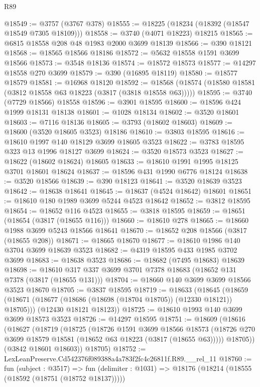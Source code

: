 \begin{lexlean}{R89}
\begin{coremodule}
@18549 := @3757 (@3767 @378)
@18555 := @18225 (@18234 (@18392 (@18547 @18549 @7305 @18109)))
@18558 := @3740 (@4071 @18223) @18215
@18565 := @6815 @18558 @208 @48 @1983 @2000 @3699 @18139
@18566 := @390 @18121
@18568 := @18565 @18566 @18186
@18572 := @5632 @18558 @1591 @3699 @18566
@18573 := @3548 @18136
@18574 := @18572 @18573
@18577 := @14297 @18558 @270 @3699
@18579 := @390 (@16895 @18119)
@18580 := @18577 @18579
@18581 := @16968 @18120
@18592 := @18568 (@18574 (@18580 @18581 (@3812 @18558 @63 @18223 (@3817 (@3818 @18558 @63)))))
@18595 := @3740 (@7729 @18566) @18558
@18596 := @3901 @18595
@18600 := @18596 @424 @1999 @18131 @18138
@18601 := @1028 @18134
@18602 := @3520 @18601
@18603 := @7116 @18136
@18605 := @3793 (@18602 @18603)
@18609 := @18600 (@3520 @18605 @3523) @18186
@18610 := @3803 @18595
@18616 := @18610 @1997 @140 @18129 @3699 @18605 @3523
@18622 := @3783 @18595 @323 @13 @1996 @18127 @3699
@18624 := @3520 @18573 @3523
@18627 := @18622 (@18602 @18624) @18605
@18633 := @18610 @1991 @1995 @18125 @3701 @18601 @18624
@18637 := @18596 @431 @1990 @6776 @18124
@18638 := @3520 @18566
@18639 := @390 @18123
@18641 := @3520 @18639 @3523
@18642 := @18638 @18641
@18645 := @18637 (@4524 @18642) @18601
@18651 := @18610 @180 @1989 @3699 @5244 @4523 @18642
@18652 := @3812 @18595
@18654 := @18652 @116 @4523
@18655 := @3818 @18595
@18659 := @18651 (@18654 (@3817 (@18655 @116)))
@18660 := @18610 @278
@18665 := @18660 @1988 @3699 @5243 @18566 @18641
@18670 := @18652 @208 @18566 (@3817 (@18655 @208))
@18671 := @18665 @18670
@18677 := @18610 @1986 @140 @3704 @3699 @18639 @3523
@18682 := @4319 @18595 @433 @1985 @3702 @3699
@18683 := @18638 @3523
@18686 := @18682 (@7495 @18683) @18639
@18698 := @18610 @317 @337 @3699 @3701 @7378 @18683 (@18652 @131 @7378 (@3817 (@18655 @131)))
@18704 := @18660 @140 @3699 @3699 @18566 @3523 @18670
@18705 := @3837 @18595
@18719 := @18633
    (@18645
      (@18659 (@18671 (@18677 (@18686 (@18698 (@18704 @18705)) (@12330 @18121)) @18705)))
      (@12430 @18121 @18123))
@18725 := @18610 @1993 @140 @3699 @3699 @18573 @3523
@18726 := @14297 @18595
@18751 := @18609
    (@18616
      (@18627
        (@18719
          (@18725
            (@18726
              @1591
              @3699
              @18566
              @18573
              (@18726 @270 @3699 @18579 @18581 (@18652 @63 @18223 (@3817 (@18655 @63)))))
            @18705))
        (@3842 @18601 @18603))
      @18705)
@18752 := LexLeanPreserve.Cd542376f089388a4a783f2fc4c26811f.R89.__rel_11
@18760 := fun (subject : @3517) =>
  fun (delimiter : @1031) => @18176 (@18214 (@18555 (@18592 (@18751 (@18752 @18137)))))

\end{coremodule}
\end{lexlean}
